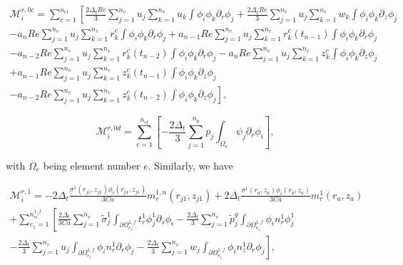 \documentclass{article}
\begin{document}
\begin{equation}
\begin{array}{l} \mathcal{M}_i^{r,0c} = \sum_{e=1}^{n_{el}} \left[ \frac{2\Delta_t Re}{3} \sum_{j=1}^{n_v} u_j \sum_{k=1}^{n_v} u_k \int \phi_i \phi_k \partial_r \phi_j + \frac{2\Delta_t Re}{3} \sum_{j=1}^{n_v} u_j \sum_{k=1}^{n_v} w_k \int \phi_i \phi_k \partial_z \phi_j \right. \\ - a_n Re \sum_{j=1}^{n_v} u_j \sum_{k=1}^{n_v} r_k^c \int \phi_i \phi_k \partial_r \phi_j + a_{n-1} Re \sum_{j=1}^{n_v} u_j \sum_{k=1}^{n_v} r_k^c(t_{n-1}) \int \phi_i \phi_k \partial_r \phi_j \\ - a_{n-2} Re \sum_{j=1}^{n_v} u_j \sum_{k=1}^{n_v} r_k^c(t_{n-2}) \int \phi_i \phi_k \partial_r \phi_j - a_n Re \sum_{j=1}^{n_v} u_j \sum_{k=1}^{n_v} z_k^c \int \phi_i \phi_k \partial_z \phi_j \\ + a_{n-1} Re \sum_{j=1}^{n_v} u_j \sum_{k=1}^{n_v} z_k^c(t_{n-1}) \int \phi_i \phi_k \partial_z \phi_j \\ \left. - a_{n-2} Re \sum_{j=1}^{n_v} u_j \sum_{k=1}^{n_v} z_k^c(t_{n-2}) \int \phi_i \phi_k \partial_z \phi_j \right], \end{array} \tag{4.100}
\end{equation}

\begin{equation}
\mathcal{M}_i^{r,0d} = \sum_{e=1}^{n_{el}} \left[ -\frac{2\Delta_t}{3} \sum_{j=1}^{n_p} p_j \int_{\Omega_e} \psi_j \partial_r \phi_i \right], \tag{4.101}
\end{equation}

with \(\Omega_e\) being element number \(e\). Similarly, we have

\begin{equation}
\begin{array}{l} \mathcal{M}_i^{r,1} = -2\Delta_t \frac{\sigma^1(r_{j1},z_{j1})\phi_i(r_{j1},z_{j1})}{3Ca} m_r^{1,n}(r_{j1},z_{j1}) + 2\Delta_t \frac{\sigma^1(r_a,z_a)\phi_i(r_a,z_a)}{3Ca} m_r^{1}(r_a,z_a) \\ + \sum_{e_1=1}^{n_{el}^{1,f}} \left[ \frac{2\Delta_t}{3Ca} \sum_{j=1}^{n_v} \tilde{\sigma}_j^1 \int_{\partial \Omega_{e_1}^{1,f}} t_r^1 \phi_j^1 \partial_s \phi_i - \frac{2\Delta_t}{3} \sum_{j=1}^{n_v} \tilde{p}_j^g \int_{\partial \Omega_{e_1}^{1,f}} \phi_i n_r^1 \phi_j^1 \right. \\ \left. - \frac{2\Delta_t}{3} \sum_{j=1}^{n_v} u_j \int_{\partial \Omega_{e_1}^{1,f}} \phi_i n_r^1 \partial_r \phi_j - \frac{2\Delta_t}{3} \sum_{j=1}^{n_v} w_j \int_{\partial \Omega_{e_1}^{1,f}} \phi_i n_z^1 \partial_r \phi_j \right], \end{array} \tag{4.102}
\end{equation}
\end{document}
